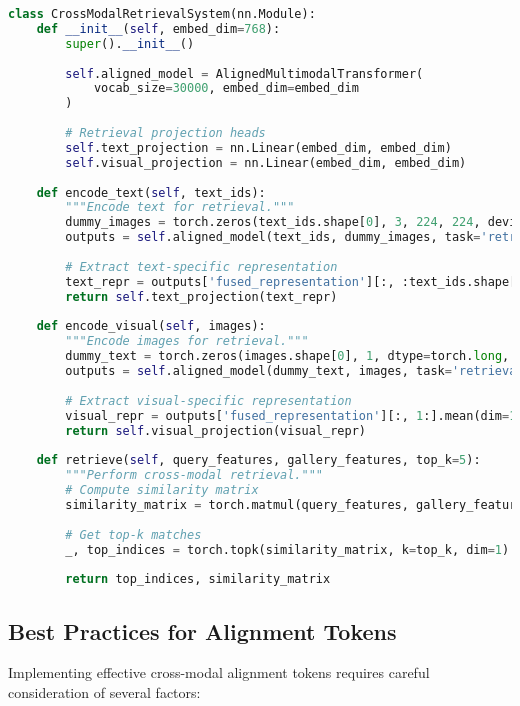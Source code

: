\begin{lstlisting}[language=Python, caption=Cross-modal retrieval with alignment tokens]
class CrossModalRetrievalSystem(nn.Module):
    def __init__(self, embed_dim=768):
        super().__init__()
        
        self.aligned_model = AlignedMultimodalTransformer(
            vocab_size=30000, embed_dim=embed_dim
        )
        
        # Retrieval projection heads
        self.text_projection = nn.Linear(embed_dim, embed_dim)
        self.visual_projection = nn.Linear(embed_dim, embed_dim)
        
    def encode_text(self, text_ids):
        """Encode text for retrieval."""
        dummy_images = torch.zeros(text_ids.shape[0], 3, 224, 224, device=text_ids.device)
        outputs = self.aligned_model(text_ids, dummy_images, task='retrieval')
        
        # Extract text-specific representation
        text_repr = outputs['fused_representation'][:, :text_ids.shape[1]].mean(dim=1)
        return self.text_projection(text_repr)
    
    def encode_visual(self, images):
        """Encode images for retrieval."""
        dummy_text = torch.zeros(images.shape[0], 1, dtype=torch.long, device=images.device)
        outputs = self.aligned_model(dummy_text, images, task='retrieval')
        
        # Extract visual-specific representation
        visual_repr = outputs['fused_representation'][:, 1:].mean(dim=1)  # Skip text token
        return self.visual_projection(visual_repr)
    
    def retrieve(self, query_features, gallery_features, top_k=5):
        """Perform cross-modal retrieval."""
        # Compute similarity matrix
        similarity_matrix = torch.matmul(query_features, gallery_features.t())
        
        # Get top-k matches
        _, top_indices = torch.topk(similarity_matrix, k=top_k, dim=1)
        
        return top_indices, similarity_matrix
\end{lstlisting}

\subsection{Best Practices for Alignment Tokens}

Implementing effective cross-modal alignment tokens requires careful consideration of several factors:

